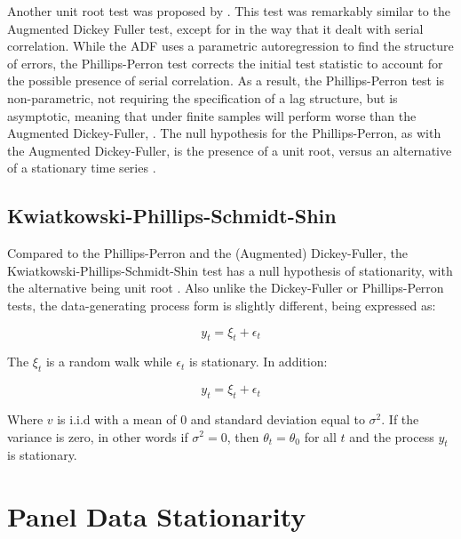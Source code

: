 Another unit root test was proposed by \citet{pp}. This test was remarkably similar to the Augmented Dickey Fuller test, except for in the way that it dealt with serial correlation. While the ADF uses a parametric autoregression to find the structure of errors, the Phillips-Perron test corrects the initial test statistic to account for the possible presence of serial correlation. As a result, the Phillips-Perron test is non-parametric, not requiring the specification of a lag structure, but is asymptotic, meaning that under finite samples will perform worse than the Augmented Dickey-Fuller, \citep{davidson2004econometric}. The null hypothesis for the Phillips-Perron, as with the Augmented Dickey-Fuller, is the presence of a unit root, versus an alternative of a stationary time series \citep{pp}.

\subsection{Kwiatkowski-Phillips-Schmidt-Shin}

Compared to the Phillips-Perron and the (Augmented) Dickey-Fuller, the Kwiatkowski-Phillips-Schmidt-Shin test has a null hypothesis of stationarity, with the alternative being unit root \citep{kpss}. Also unlike the Dickey-Fuller or Phillips-Perron tests, the data-generating process form is slightly different, being expressed as:

\begin{equation}
y_t = \xi_t + \epsilon_t
\end{equation}

The $\xi_t$ is a random walk while $\epsilon_t$ is stationary. In addition:

\begin{equation}
y_t = \xi_t + \epsilon_t
\end{equation}

Where $v$ is i.i.d with a mean of 0 and standard deviation equal to $\sigma^2$. If the variance is zero, in other words if $\sigma^2 = 0$, then $\theta_t = \theta_0$ for all $t$ and the process $y_t$ is stationary.

\section{Panel Data Stationarity}

